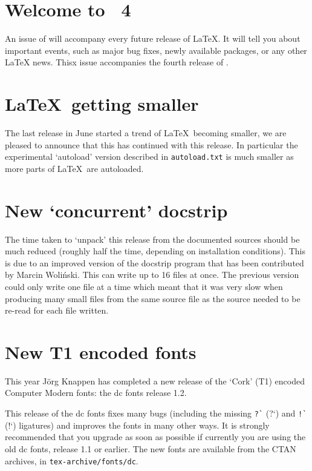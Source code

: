 \documentclass{ltnews}
\providecommand\file[1]{\texttt{#1}}
\begin{document}
\maketitle

\section{Welcome to \LaTeXNews~4}

An issue of \emph{\LaTeXNews} will accompany every future release of
\LaTeX.  It will tell you about important events, such as major bug
fixes, newly available packages, or any other \LaTeX{} news.
Thisx issue accompanies the fourth release of \LaTeXe.


\section{\LaTeX\ getting smaller}

The last release in June started a trend of \LaTeX\ becoming
smaller, we are pleased to announce that this has continued with this
release. In particular the experimental `autoload' version described in
\file{autoload.txt} is much smaller as more parts of \LaTeX\ are
autoloaded.

\section{New `concurrent' docstrip}

The time taken to `unpack' this release from the documented sources
should be much reduced (roughly half the time, depending on
installation conditions). This is due to an improved version of the
docstrip program that has been contributed by Marcin Woli\'nski.
This can write up to 16 files at once. The
previous version could only write one file at a time which meant that
it was very slow when producing many small files from the same source
file as the source needed to be re-read for each file written.

\section{New T1 encoded fonts}

This year J\"org Knappen has completed a new release of the `Cork'
(T1) encoded Computer Modern fonts: the dc fonts release 1.2.

This release of the dc fonts fixes many bugs (including the missing
\verb|?`| (?`) and \verb|!`| (!`) ligatures) and improves the fonts in
many other ways. It is strongly recommended that you upgrade as soon as
possible if currently you are using the old dc fonts, release 1.1 or
earlier. The new fonts are available from the CTAN archives, in
\file{tex-archive/fonts/dc}.
\end{document}

